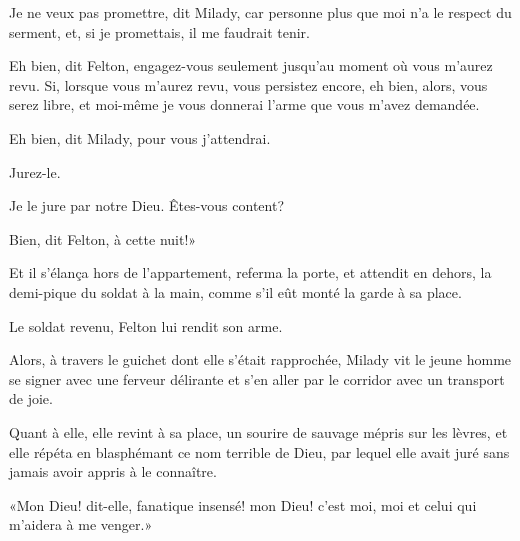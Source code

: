 \speak  Je ne veux pas promettre, dit Milady, car personne plus que moi n'a le respect du serment, et, si je promettais, il me faudrait tenir. 

\speak  Eh bien, dit Felton, engagez-vous seulement jusqu'au moment où vous m'aurez revu. Si, lorsque vous m'aurez revu, vous persistez encore, eh bien, alors, vous serez libre, et moi-même je vous donnerai l'arme que vous m'avez demandée. 

\speak  Eh bien, dit Milady, pour vous j'attendrai. 

\speak  Jurez-le. 

\speak  Je le jure par notre Dieu. Êtes-vous content? 

\speak  Bien, dit Felton, à cette nuit!» 

Et il s'élança hors de l'appartement, referma la porte, et attendit en dehors, la demi-pique du soldat à la main, comme s'il eût monté la garde à sa place. 

Le soldat revenu, Felton lui rendit son arme. 

Alors, à travers le guichet dont elle s'était rapprochée, Milady vit le jeune homme se signer avec une ferveur délirante et s'en aller par le corridor avec un transport de joie. 

Quant à elle, elle revint à sa place, un sourire de sauvage mépris sur les lèvres, et elle répéta en blasphémant ce nom terrible de Dieu, par lequel elle avait juré sans jamais avoir appris à le connaître. 

«Mon Dieu! dit-elle, fanatique insensé! mon Dieu! c'est moi, moi et celui qui m'aidera à me venger.»